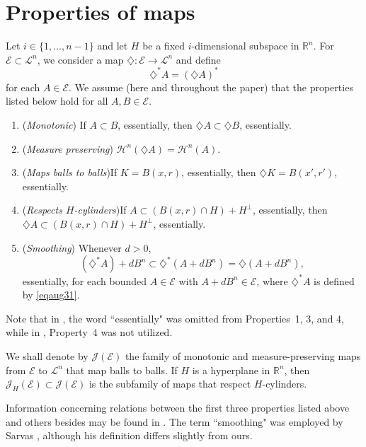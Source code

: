\documentclass[12pt,reqno]{amsart}
\newcommand{\R}{{\mathbb R}}
\newcommand{\cL}{\mathcal L}
\newcommand{\cJ}{\mathcal J}
\newcommand{\cE}{{\mathcal E}}
\newcommand{\di}{\diamondsuit}
\numberwithin{equation}{section}
\begin{document}
\section{Properties of maps}\label{Properties}

Let $i\in \{1,\dots,n-1\}$ and let $H$ be a fixed $i$-dimensional subspace in $\R^n$.  For ${\mathcal{E}}\subset {\cL}^n$, we consider a map $\di:{\mathcal{E}}\to {\mathcal{L}}^n$ and define
\begin{equation}\label{eqaug31}
\di^*A=(\di A)^*
\end{equation}
for each $A\in {\mathcal{E}}$.  We assume (here and throughout the paper) that the properties listed below hold for all $A,B\in {\mathcal{E}}$.

\begin{enumerate}
        \item[1.]  ({\em Monotonic}) \quad If $A\subset B$, essentially, then $\di A\subset \di B$, essentially.
		\item[2.]  ({\em Measure preserving}) \quad ${\mathcal H}^n(\di A)={\mathcal H}^n(A)$.
		\item[3.] ({\em Maps balls to balls})\quad If $K=B(x,r)$, essentially,  then $\di K=B(x',r')$, essentially.
		\item[4.]  ({\em Respects $H$-cylinders})\quad If $A\subset (B(x,r)\cap H)+H^{\perp}$, essentially, then $\di A\subset (B(x,r)\cap H)+H^{\perp}$, essentially.
		\item[5.]  ({\em Smoothing}) \quad Whenever $d>0$,
		\begin{equation}\label{eq:smothDef}
			(\di^*A)+d B^n\subset \di^*(A+d B^n)=\di(A+d B^n),
		\end{equation}
		essentially, for each bounded $A\in \cE$ with $A+dB^n\in {\mathcal{E}}$, where $\di^*A$ is defined by \eqref{eqaug31}.
\end{enumerate}

Note that in \cite{BGGK1}, the word ``essentially" was omitted from Properties~1, 3, and 4, while in \cite{BGGK2}, Property~4 was not utilized.

We shall denote by $\cJ(\cE)$ the family of monotonic and measure-preserving maps from $\cE$ to $\cL^n$ that map balls to balls.  If $H$ is a hyperplane in $\R^n$, then $\cJ_H(\cE)\subset \cJ(\cE)$ is the subfamily of maps that respect $H$-cylinders.

Information concerning relations between the first three properties listed above and others besides may be found in \cite[Sections~3 and~6]{BGGK1}. The term ``smoothing" was employed by Sarvas \cite[p.~11]{Sar72}, although his definition differs slightly from ours.
\end{document}
